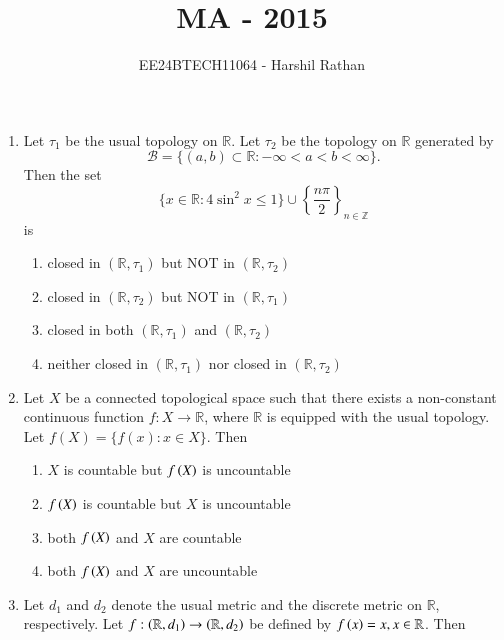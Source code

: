 \documentclass[journal]{IEEEtran}
\begin{document}

\vspace{3cm}

\title{MA - 2015}
\author{EE24BTECH11064 - Harshil Rathan}
\maketitle

\renewcommand{\thefigure}{\theenumi}
\renewcommand{\thetable}{\theenumi}

\begin{enumerate}
\item Let $\tau_1$ be the usual topology on $\mathbb{R}$. Let $\tau_2$ be the topology on $\mathbb{R}$ generated by \[
\mathcal{B} = \{ (a, b) \subset \mathbb{R} : -\infty < a < b < \infty \}.
\]
Then the set 
\[
\{ x \in \mathbb{R} : 4 \sin^2 x \leq 1 \} \cup \left\{ \frac{n\pi}{2} \right\}_{n \in \mathbb{Z}}
\]
is
\begin{enumerate}
    \item closed in $(\mathbb{R}, \tau_1)$ but NOT in $(\mathbb{R}, \tau_2)$
    \item closed in $(\mathbb{R}, \tau_2)$ but NOT in $(\mathbb{R}, \tau_1)$
    \item closed in both $(\mathbb{R}, \tau_1)$ and $(\mathbb{R}, \tau_2)$
    \item neither closed in $(\mathbb{R}, \tau_1)$ nor closed in $(\mathbb{R}, \tau_2)$
\end{enumerate}
\vspace{0.5cm}
\item Let $X$ be a connected topological space such that there exists a non-constant continuous function 
$f : X \to \mathbb{R}$,
where $\mathbb{R}$ is equipped with the usual topology. Let 
$f(X) = \{ f(x) : x \in X \}$.
Then
\begin{enumerate}
      \item $X$ is countable but $f\left(X\right)$ is uncountable
        \item $f\left(X\right)$ is countable but $X$ is uncountable
        \item both $f\left(X\right)$ and $X$ are countable
        \item both $f\left(X\right)$ and $X$ are uncountable
\end{enumerate}
\vspace{0.5cm}
\item Let $d_1$ and $d_2$ denote the usual metric and the discrete metric on $\mathbb{R}$, respectively. Let $f: \left(\mathbb{R},d_1\right)\rightarrow \left(\mathbb{R},d_2\right)$ be defined by $f\left(x\right)=x,x\in \mathbb{R}$. Then 

\end{enumerate}
\end{document}
